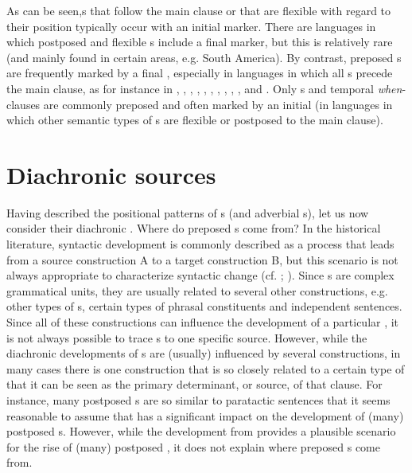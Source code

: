 \documentclass[output=paper]{langsci/langscibook}
\begin{document}
As can be seen,s that follow the main clause or that are flexible with regard to their position typically occur with an initial marker. There are languages in which postposed and flexible s include a final marker, but this is relatively rare (and mainly found in certain areas, e.g. South America). By contrast, preposed s are frequently marked by a final , especially in languages in which all s precede the main clause, as for instance in , , , , , , , , , , and . Only s and temporal \textit{when}-clauses are commonly preposed and often marked by an initial  (in languages in which other semantic types of s \largerpage are flexible or postposed to the main clause). 

\section{Diachronic sources}\label{sec:diessel:3}

Having described the positional patterns of s (and adverbial s), let us now consider their diachronic . Where do preposed s come from? In the historical literature, syntactic development is commonly described as a process that leads from a source construction A to a target construction B, but this scenario is not always appropriate to characterize syntactic change (cf. \citealt{Givón1991};  \citealt{VandeVeldeEtAl2013}). Since s are complex grammatical units, they are usually related to several other constructions, e.g. other types of s, certain types of phrasal constituents and independent sentences. Since all of these constructions can influence the development of a particular , it is not always possible to trace s to one specific source. However, while the diachronic developments of s are (usually) influenced by several constructions, in many cases there is one construction that is so closely related to a certain type of  that it can be seen as the primary determinant, or source, of that clause. For instance, many postposed s are so similar to paratactic sentences that it seems reasonable to assume that  has a significant impact on the development of (many) postposed s. However, while the development from  provides a plausible scenario for the rise of (many) postposed , it does not explain where preposed s come from.
\end{document}
